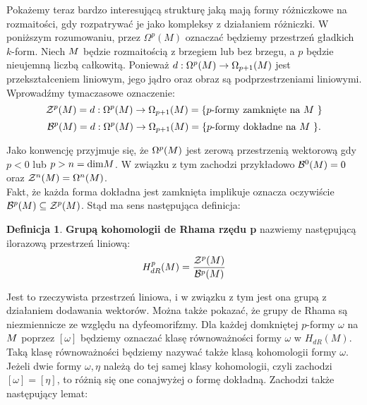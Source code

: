 \documentclass[licencjacka]{pracamgr}
\theoremstyle{definition}
\newtheorem{definition}{Definicja}[section]
\theoremstyle{definition}
\theoremstyle{plain}
\theoremstyle{plain}
\def\M{\ensuremath M}
\begin{document}
Pokażemy teraz bardzo interesującą strukturę jaką mają formy różniczkowe
na rozmaitości, gdy rozpatrywać je jako kompleksy z działaniem różniczki.
W poniższym rozumowaniu, przez $\Omega^p (M)$ oznaczać będziemy
przestrzeń gładkich $k$-form.  Niech $\M$ będzie rozmaitością z
brzegiem lub bez brzegu, a $p$ będzie nieujemną liczbą całkowitą.
Ponieważ $d: \Omega^p (\M ) \rightarrow \Omega_{p+1}(\M) $ jest
przekształceniem liniowym, jego jądro oraz obraz są podprzestrzeniami
liniowymi. Wprowadźmy tymaczasowe oznaczenie:
\[
\mathcal{Z}^p ( \M ) =
d: \Omega^{p} (\M ) \rightarrow \Omega_{p+1}(\M) =
\{\text{$p$-formy zamknięte na $\M$ } \}
\]
\[
\mathcal{B}^p ( \M ) =
d: \Omega^{p} (\M ) \rightarrow \Omega_{p+1}(\M) =
\{\text{$p$-formy dokładne na $\M$ } \}.
\]

Jako konwencję przyjmuje się, że $\Omega^{p} ( \M ) $ jest zerową
przestrzenią wektorową gdy $p < 0$ lub $p > n = \text{dim} \M $. W
związku z tym zachodzi przykładowo $\mathcal{B}^0(\M)=0$ oraz
$\mathcal{Z}^n(\M)= \Omega^n(\M)$. \\

Fakt, że każda forma dokładna jest zamknięta implikuje oznacza oczywiście
$ \mathcal{B}^p ( \M) \subseteq \mathcal{Z}^p ( \M) $.
Stąd ma sens następująca definicja:

\begin{definition}
  \textbf{Grupą kohomologii de Rhama rzędu p} nazwiemy następującą
  ilorazową przestrzeń liniową:
  \[
  H^{p}_{dR} ( \M ) = \frac {\mathcal{Z}^p ( \M )} {\mathcal{B}^p ( \M )}
  \]
\end{definition}
Jest to rzeczywista przestrzeń liniowa, i w związku z tym jest ona
grupą z działaniem dodawania wektorów. Można także pokazać, że grupy de Rhama są
niezmiennicze ze względu na dyfeomorifzmy. Dla każdej domkniętej $p$-formy
$\omega$ na $\M$ poprzez $[\omega]$ będziemy oznaczać klasę równoważności
formy $\omega$ w $H_{dR} (M)$. Taką klasę równoważności będziemy nazywać także klasą
kohomologii formy $\omega$. Jeżeli dwie formy $\omega, \eta$ należą do tej samej klasy
kohomologii, czyli zachodzi $[\omega] = [\eta]$, to różnią się one conajwyżej o formę
dokładną. Zachodzi także następujący lemat:
\end{document}
